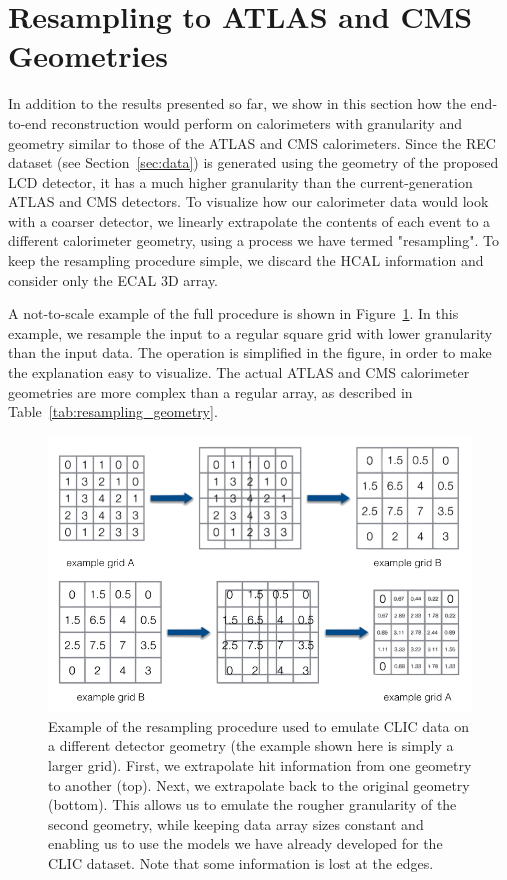 \section{Resampling to ATLAS and CMS Geometries}\label{sec:resampling}

In addition to the results presented so far, we show in this section how the end-to-end reconstruction would perform on calorimeters with granularity and geometry similar to those of the ATLAS and CMS calorimeters. Since the REC dataset (see Section~\ref{sec:data}) is generated using the geometry of the proposed LCD detector, it has a much higher granularity than the current-generation ATLAS and CMS detectors. To visualize how our calorimeter data would look with a coarser detector, we linearly extrapolate the contents of each event to a different calorimeter geometry, using a process we have termed "resampling". To keep the resampling procedure simple, we discard the HCAL information and consider only the ECAL 3D array.

A not-to-scale example of the full procedure is shown in Figure~\ref{fig:resampling}. In this example, we resample the input to a regular square grid with lower granularity than the input data. The operation is simplified in the figure, in order to make the explanation easy to visualize. The actual ATLAS and CMS calorimeter geometries are more complex than a regular array, as described in Table~\ref{tab:resampling_geometry}.

\begin{figure}[htbp]
    \centering
    \includegraphics[scale=0.3, clip]{Images/Calo/resampling.png}
    \caption{Example of the resampling procedure used to emulate CLIC data on a different detector geometry (the example shown here is simply a larger grid). First, we extrapolate hit information from one geometry to another (top). Next, we extrapolate back to the original geometry (bottom). This allows us to emulate the rougher granularity of the second geometry, while keeping data array sizes constant and enabling us to use the models we have already developed for the CLIC dataset. Note that some information is lost at the edges.}
    \label{fig:resampling}
\end{figure}

